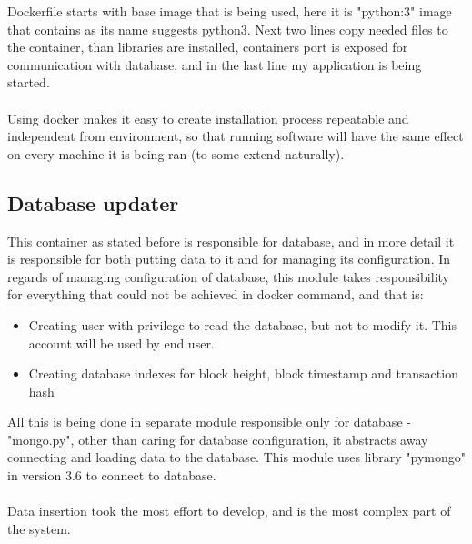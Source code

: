 \documentclass[12pt, en, eng]{mgr}
\begin{document}
Dockerfile starts with base image that is being used, here it is "python:3" image that contains as its name suggests python3.
Next two lines copy needed files to the container, than libraries are installed, containers port is exposed for communication with database, and in the last line my application is being started.
\\
\\
Using docker makes it easy to create installation process repeatable and independent from environment, so that running software will have the same effect on every machine it is being ran (to some extend naturally). 

\subsection{Database updater}
This container as stated before is responsible for database, and in more detail it is responsible for both putting data to it and for managing its configuration. In regards of managing configuration of database, this module takes responsibility for everything that could not be achieved in docker command, and that is:

\begin{itemize}
\item
Creating user with privilege to read the database, but not to modify it. This account will be used by end user.
\item
Creating database indexes for block height, block timestamp and transaction hash
\end{itemize}

All this is being done in separate module responsible only for database - "mongo.py", other than caring for database configuration, it abstracts away connecting and loading data to the database. This module uses library "pymongo" in version 3.6 to connect to database.
\\
\\  
Data insertion took the most effort to develop, and is the most complex part of the system.
\end{document}
